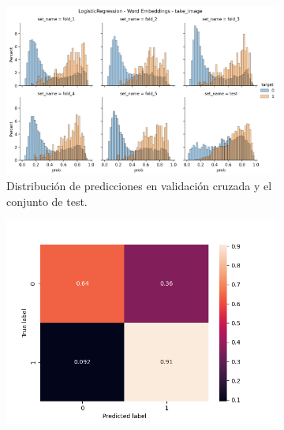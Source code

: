 \begin{figure}
    \begin{subfigure}[b]{\textwidth}
        \centering
        \includegraphics[width=\linewidth]{figures/results/word_embeddings/lgr/take_image/lgr__distplot.png}
        \caption{Distribución de predicciones en validación cruzada y el conjunto de test.}
        \label{fig:takeimage-bestmodel-distplot}
    \end{subfigure}
    \hfill
    \begin{subfigure}[b]{\textwidth}
      \includegraphics[width=\linewidth]{figures/results/word_embeddings/lgr/take_image/lgr_set_1_confusion_matrix_percent.png}
    \endminipage\hfill

\end{subfigure}
\end{figure}
